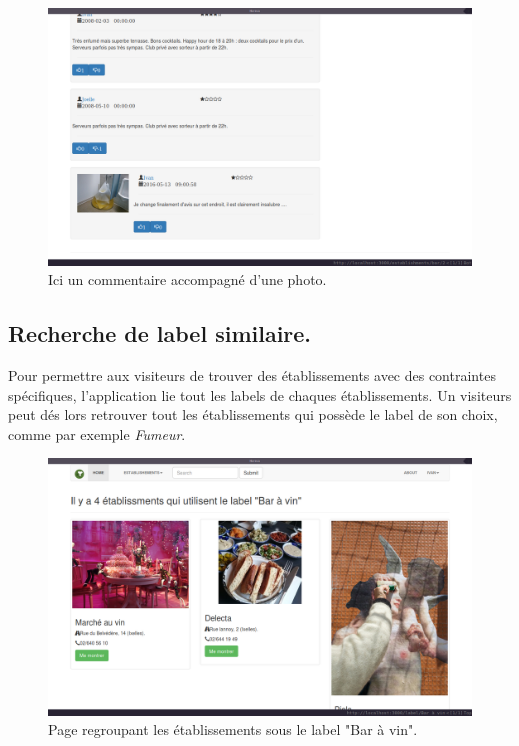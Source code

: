 \documentclass[a4paper,10pt]{article}
\begin{document}
    \begin{figure}[h]
        \centering
        \includegraphics[scale=0.3]{./images/picture.png}
        \caption{Ici un commentaire accompagné d'une photo.}
    \end{figure}

\subsection{Recherche de label similaire.}
    Pour permettre aux visiteurs de trouver des établissements avec des
    contraintes spécifiques, l'application lie tout les labels de chaques
    établissements. Un visiteurs peut dés lors retrouver tout les
    établissements qui possède le label de son choix, comme par exemple
    \emph{Fumeur}.

    \begin{figure}[h]
        \centering
        \includegraphics[scale=0.3]{./images/label.png}
        \caption{Page regroupant les établissements sous le label "Bar à vin".}
    \end{figure}
\end{document}
